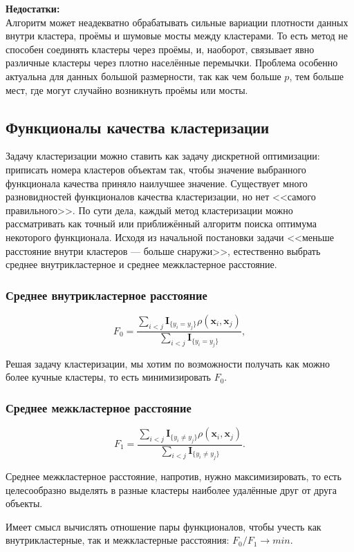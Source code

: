 \documentclass[10pt]{article}
\begin{document}
\textbf{Недостатки:}\\ 
	Алгоритм может неадекватно обрабатывать сильные вариации плотности данных внутри кластера, проёмы и шумовые мосты между кластерами.
	То есть метод не способен соединять кластеры через проёмы, и, наоборот, связывает явно различные кластеры через плотно населённые перемычки. Проблема особенно актуальна для данных большой размерности, так как чем больше $p$, тем больше мест, где могут случайно возникнуть проёмы или мосты. 

\subsection{Функционалы качества кластеризации}

Задачу кластеризации можно ставить как задачу дискретной оптимизации:
приписать номера кластеров объектам так, чтобы значение выбранного функционала качества приняло наилучшее значение.
Существует много разновидностей функционалов качества кластеризации, но нет <<самого правильного>>. По сути дела, каждый метод кластеризации можно рассматривать как точный или приближённый алгоритм поиска оптимума некоторого функционала.	
Исходя из начальной постановки задачи <<меньше расстояние внутри кластеров --- больше снаружи>>, естественно выбрать среднее внутрикластерное и среднее межкластерное расстояние.

\subsubsection{Среднее внутрикластерное расстояние}
$$F_0 = \frac{\sum_{i < j}\mathbf{I}_{\{y_i = y_j\}}\rho(\pmb x_i, \pmb x_j)}{\sum_{i < j}\mathbf{I}_{\{y_i = y_j\}}},$$ 

Решая задачу кластеризации, мы хотим по возможности получать как можно более кучные кластеры, то есть минимизировать $F_0$.

\subsubsection{Среднее межкластерное расстояние}

$$F_1 = \frac{\sum_{i < j}\mathbf{I}_{\{y_i \neq y_j\}}\rho(\pmb x_i, \pmb x_j)}{\sum_{i < j}\mathbf{I}_{\{y_i \neq y_j\}}}.$$

Среднее межкластерное расстояние, напротив, нужно максимизировать, то есть целесообразно выделять в разные кластеры наиболее удалённые друг от друга объекты.

Имеет смысл вычислять отношение пары функционалов, чтобы учесть как внутрикластерные, так и межкластерные расстояния: $F_0/F_1 \rightarrow min$.
\end{document}
